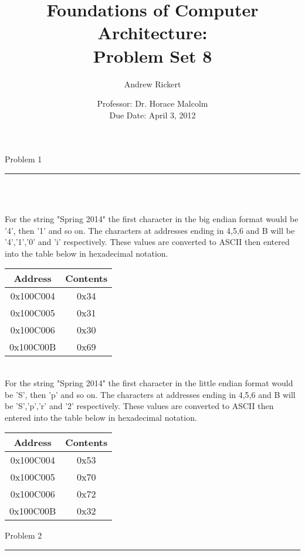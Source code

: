\documentclass[11pt,reqno]{article}
\title{Foundations of Computer Architecture: \\ Problem Set 8 }
\author{Andrew Rickert}
\date{Professor: Dr. Horace Malcolm \\ \hspace{-46pt} Due Date: April 3,  2012}                                           %
\begin{document}
\maketitle


\begin{flushleft} 
Problem 1 \\
\rule{500pt}{1pt}\\
\end{flushleft} 

\noindent{}\\ 

For the string "Spring 2014" the first character in the big endian format would be '4', then '1' and so on. The characters at addresses ending in 4,5,6 and B will be '4','1','0' and 'i' respectively. These values are converted to ASCII then entered into the table below in hexadecimal notation.\\

\begin{tabular}{| c | c |}
\hline
Address & Contents \\ \hline
0x100C004 & 0x34\\ \hline
0x100C005 & 0x31\\ \hline
0x100C006 & 0x30\\ \hline
0x100C00B & 0x69\\ \hline
\end{tabular}
\vspace{10pt}

\noindent{}\\ 

For the string "Spring 2014" the first character in the little endian format would be 'S', then 'p' and so on. The characters at addresses ending in 4,5,6 and B will be 'S','p','r' and '2' respectively. These values are converted to ASCII then entered into the table below in hexadecimal notation.\\

\begin{tabular}{| c | c |}
\hline
Address & Contents \\ \hline
0x100C004 & 0x53\\ \hline
0x100C005 & 0x70\\ \hline
0x100C006 & 0x72\\ \hline
0x100C00B & 0x32\\ \hline
\end{tabular}
\newpage

\begin{flushleft} 
Problem 2 \\
\rule{500pt}{1pt}\\
\end{flushleft} 
\end{document}
